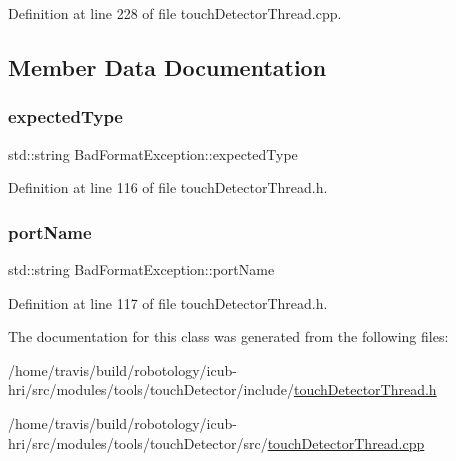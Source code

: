 Definition at line 228 of file touch\+Detector\+Thread.\+cpp.



\subsection{Member Data Documentation}
\mbox{\label{classBadFormatException_ac7be97af06e47ba6396c68c21fe3f597}} 
\subsubsection{\texorpdfstring{expected\+Type}{expectedType}}
{\footnotesize\ttfamily std\+::string Bad\+Format\+Exception\+::expected\+Type}



Definition at line 116 of file touch\+Detector\+Thread.\+h.

\mbox{\label{classBadFormatException_a25ca089d2a0981d4a549eefd0502524d}} 
\subsubsection{\texorpdfstring{port\+Name}{portName}}
{\footnotesize\ttfamily std\+::string Bad\+Format\+Exception\+::port\+Name}



Definition at line 117 of file touch\+Detector\+Thread.\+h.



The documentation for this class was generated from the following files\+:\begin{DoxyCompactItemize}
\item 
/home/travis/build/robotology/icub-\/hri/src/modules/tools/touch\+Detector/include/\hyperlink{touchDetectorThread_8h}{touch\+Detector\+Thread.\+h}\item 
/home/travis/build/robotology/icub-\/hri/src/modules/tools/touch\+Detector/src/\hyperlink{touchDetectorThread_8cpp}{touch\+Detector\+Thread.\+cpp}\end{DoxyCompactItemize}
